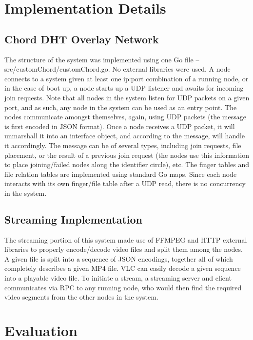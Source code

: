 \documentclass[fleqn,24pt]{SelfArx} %
\begin{document}
\section{Implementation Details}

\subsection{Chord DHT Overlay Network}

The structure of the system was implemented using one Go file -- src/customChord/customChord.go. No external libraries were used. A node connects to a system given at least one ip:port combination of a running node, or in the case of boot up, a node starts up a UDP listener and awaits for incoming join requests. Note that all nodes in the system listen for UDP packets on a given port, and as such, any node in the system can be used as an entry point. The nodes communicate amongst themselves, again, using UDP packets (the message is first encoded in JSON format). Once a node receives a UDP packet, it will unmarshall it into an interface object, and according to the message, will handle it accordingly. The message can be of several types, including join requests, file placement, or the result of a previous join request (the nodes use this information to place joining/failed nodes along the identifier circle), etc. The finger tables and file relation tables are implemented using standard Go maps. Since each node interacts with its own finger/file table after a UDP read, there is no concurrency in the system.

\subsection{Streaming Implementation}

The streaming portion of this system made use of FFMPEG and HTTP external libraries to properly encode/decode video files and split them among the nodes. A given file is split into a sequence of JSON encodings, together all of which completely describes a given MP4 file. VLC can easily decode a given sequence into a playable video file. To initiate a stream, a streaming server and client communicates via RPC to any running node, who would then find the required video segments from the other nodes in the system. 

\section{Evaluation}
\end{document}

